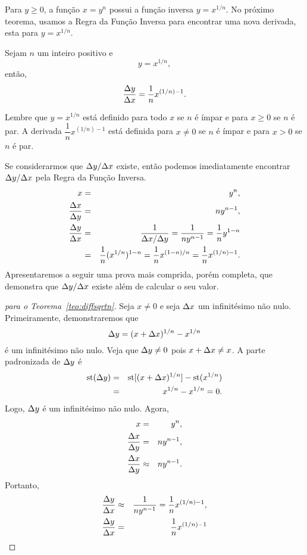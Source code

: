 Para $y \ge 0$, a função $x = y^n$ possui a função inversa $y = x^{1/n}$.
No próximo teorema, usamos a Regra da Função Inversa para encontrar uma
nova derivada, esta para $y = x^{1/n}$.

\begin{theorem}\label{teo:diffsqrtn}
Sejam $n$ um inteiro positivo e
$$
  y = x^{1/n},
$$
então,
$$
  \frac{\Delta{y}}{\Delta{x}} = \frac{1}{n} x^{(1/n)-1}.
$$
\end{theorem}

Lembre que $y = x^{1/n}$ está definido para todo $x$ se $n$ é ímpar e para
$x \ge 0$ se $n$ é par. A derivada $\dfrac{1}{n} x^{(1/n)-1}$ está definida
para $x \ne 0$ se $n$ é ímpar e para $x > 0$ se $n$ é par.

Se considerarmos que $\Delta{y}/\Delta{x}$ existe, então podemos imediatamente
encontrar $\Delta{y}/\Delta{x}$ pela Regra da Função Inversa.
\begin{eqnarray*}
  x & = & y^n, \\
  \frac{\Delta{x}}{\Delta{y}} & = & n y^{n-1}, \\
  \frac{\Delta{y}}{\Delta{x}} & = & \frac{1}{\Delta{x}/\Delta{y}} = \frac{1}{n y^{n-1}} =
                        \frac{1}{n}y^{1-n} \\
  & = & \frac{1}{n}(x^{1/n})^{1-n} = \frac{1}{n}x^{(1-n)/n} =
        \frac{1}{n}x^{(1/n)-1}.
\end{eqnarray*}
Apresentaremos a seguir uma prova mais comprida, porém completa,
que demonstra que $\Delta{y}/\Delta{x}$ existe além de calcular o seu valor.

\begin{proof}[para o Teorema~\ref{teo:diffsqrtn}]
Seja $x \ne 0$ e seja $\Delta x$ um infinitésimo não nulo. Primeiramente,
demonstraremos que
$$
  \Delta y = (x + \Delta x)^{1/n} - x^{1/n}
$$
é um infinitésimo não nulo. Veja que $\Delta y \ne 0$ pois $x + \Delta x \ne x$.
A parte padronizada de $\Delta y$ é
\begin{eqnarray*}
  \operatorname{st}(\Delta y) & = & \operatorname{st}[(x + \Delta x)^{1/n}] - \operatorname{st}(x^{1/n}) \\
            & = & x^{1/n} - x^{1/n} = 0.
\end{eqnarray*}
Logo, $\Delta y$ é um infinitésimo não nulo.
Agora,
\begin{eqnarray*}
  x & = & y^n, \\
  \frac{\Delta{x}}{\Delta{y}} & = & n y^{n-1}, \\
  \frac{\Delta x}{\Delta y} & \approx & n y^{n-1}.
\end{eqnarray*}
Portanto,
\begin{eqnarray*}
  \frac{\Delta y}{\Delta x} & \approx & \frac{1}{n y^{n-1}} =
                              \frac{1}{n} x^{(1/n)-1}, \\
  \frac{\Delta{y}}{\Delta{x}} & = & \frac{1}{n} x^{(1/n)-1}
\end{eqnarray*}
\end{proof}

